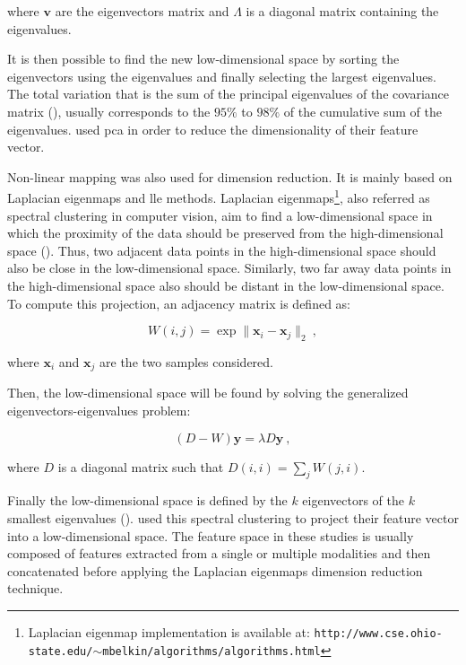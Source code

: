 \noindent where $\mathbf{v}$ are the eigenvectors matrix and $\Lambda$ is a diagonal matrix containing the eigenvalues. 

It is then possible to find the new low-dimensional space by sorting the eigenvectors using the eigenvalues and finally selecting the largest eigenvalues. The total variation that is the sum of the principal eigenvalues of the covariance matrix (\cite{Fodor2002}), usually corresponds to the $95\%$ to $98\%$ of the cumulative sum of the eigenvalues. \cite{Tiwari2008,Tiwari2009,Tiwari2012} used \ac{pca} in order to reduce the dimensionality of their feature vector.

Non-linear mapping was also used for dimension reduction. It is mainly based on Laplacian eigenmaps and \acf{lle} methods. Laplacian eigenmaps\footnote{Laplacian eigenmap implementation is available at: \texttt{http://www.cse.\allowbreak ohio-state.edu/$\sim$mbelkin/algorithms/algorithms.html}}, also referred as spectral clustering in computer vision, aim to find a low-dimensional space in which the proximity of the data should be preserved from the high-dimensional space (\cite{Shi2000,Belkin2001}). Thus, two adjacent data points in the high-dimensional space should also be close in the low-dimensional space. Similarly, two far away data points in the high-dimensional space also should be distant in the low-dimensional space. To compute this projection, an adjacency matrix is defined as:

\begin{equation}
	W(i,j) = \exp \| \mathbf{x}_i - \mathbf{x}_j \|_2 \ ,
	\label{eq:gew}
\end{equation}

\noindent where $\mathbf{x}_i$ and $\mathbf{x}_j$ are the two samples considered.

Then, the low-dimensional space will be found by solving the generalized eigenvectors-eigenvalues problem:

\begin{equation}
	(D-W)\mathbf{y} = \lambda D \mathbf{y} \ ,
	\label{eq:geeig}
\end{equation}

\noindent where $D$ is a diagonal matrix such that $D(i,i) = \sum_j W(j,i)$.

Finally the low-dimensional space is defined by the $k$ eigenvectors of the $k$ smallest eigenvalues (\cite{Belkin2001}). \cite{Tiwari2007,Tiwari2009,Tiwari2009a,Viswanath2008} used this spectral clustering to project their feature vector into a low-dimensional space. The feature space in these studies is usually composed of features extracted from a single or multiple modalities and then concatenated before applying the Laplacian eigenmaps dimension reduction technique.

